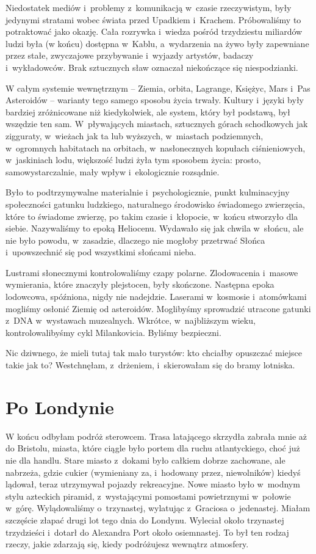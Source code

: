 \documentclass[oneside,polish,11pt,sfheadings]{mwbk}
\begin{document}
Niedostatek mediów i~problemy z~komunikacją w~czasie rzeczywistym, były
jedynymi stratami wobec świata przed Upadkiem i~Krachem. Próbowaliśmy to
potraktować jako okazję. Cała rozrywka i~wiedza pośród trzydziestu
miliardów ludzi była (w końcu) dostępna w~Kablu, a~wydarzenia na żywo
były zapewniane przez stałe, zwyczajowe przybywanie i~wyjazdy artystów,
badaczy i~wykładowców. Brak sztucznych sław oznaczał niekończące się
niespodzianki.

W całym systemie wewnętrznym -- Ziemia, orbita, Lagrange, Księżyc, Mars i~Pas Asteroidów -- warianty tego samego sposobu życia trwały. Kultury i~języki były bardziej zróżnicowane niż kiedykolwiek, ale system, który
był podstawą, był wszędzie ten sam. W~pływających miastach, sztucznych
górach schodkowych jak zigguraty, w~wieżach jak ta lub wyższych, w~miastach podziemnych, w~ogromnych habitatach na orbitach, w~nasłonecznych kopułach ciśnieniowych, w~jaskiniach lodu, większość ludzi
żyła tym sposobem życia: prosto, samowystarczalnie, mały wpływ i~ekologicznie rozsądnie.

Było to podtrzymywalne materialnie i~psychologicznie, punkt kulminacyjny
społeczności gatunku ludzkiego, naturalnego środowisko świadomego
zwierzęcia, które to świadome zwierzę, po takim czasie i~kłopocie, w~końcu stworzyło dla siebie. Nazywaliśmy to epoką Heliocenu. Wydawało się
jak chwila w~słońcu, ale nie było powodu, w~zasadzie, dlaczego nie
mogłoby przetrwać Słońca i~upowszechnić się pod wszystkimi słońcami
nieba.

Lustrami słonecznymi kontrolowaliśmy czapy polarne. Zlodowacenia i~masowe wymierania, które znaczyły plejstocen, były skończone. Następna
epoka lodowcowa, spóźniona, nigdy nie nadejdzie. Laserami w~kosmosie i~atomówkami mogliśmy osłonić Ziemię od asteroidów. Moglibyśmy sprowadzić
utracone gatunki z~DNA w~wystawach muzealnych. Wkrótce, w~najbliższym
wieku, kontrolowalibyśmy cykl Milankovicia. Byliśmy bezpieczni.

Nic dziwnego, że mieli tutaj tak mało turystów: kto chciałby opuszczać
miejsce takie jak to? Westchnęłam, z~drżeniem, i~skierowałam się do
bramy lotniska.

\chapter{Po Londynie}

W końcu odbyłam podróż sterowcem. Trasa latającego skrzydła zabrała mnie
aż do Bristolu, miasta, które ciągle było portem dla ruchu
atlantyckiego, choć już nie dla handlu. Stare miasto z~dokami było
całkiem dobrze zachowane, ale nabrzeża, gdzie cukier (wymieniany za, i~hodowany przez, niewolników) kiedyś lądował, teraz utrzymywał pojazdy
rekreacyjne. Nowe miasto było w~modnym stylu azteckich piramid, z~wystającymi pomostami powietrznymi w~połowie w~górę. Wylądowaliśmy o~trzynastej, wylatując z~Graciosa o~jedenastej. Miałam szczęście złapać
drugi lot tego dnia do Londynu. Wyleciał około trzynastej trzydzieści i~dotarł do Alexandra Port około osiemnastej. To był ten rodzaj rzeczy,
jakie zdarzają się, kiedy podróżujesz wewnątrz atmosfery.
\end{document}
